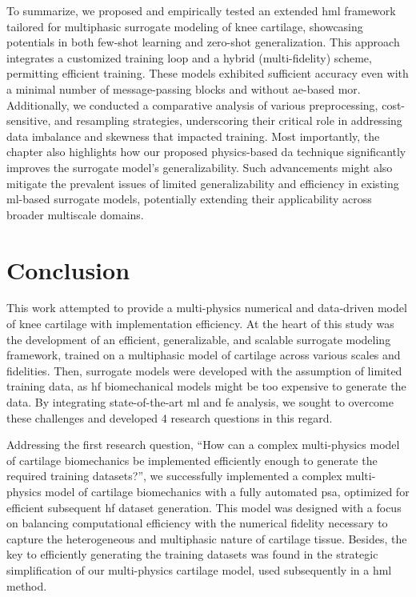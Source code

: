 To summarize, we proposed and empirically tested an extended \ac{hml} framework tailored for multiphasic surrogate modeling of knee cartilage, showcasing potentials in both few-shot learning and zero-shot generalization. This approach integrates a customized training loop and a hybrid (multi-fidelity) scheme, permitting efficient training. These models exhibited sufficient accuracy even with a minimal number of message-passing blocks and without \ac{ae}-based \ac{mor}. Additionally, we conducted a comparative analysis of various preprocessing, cost-sensitive, and resampling strategies, underscoring their critical role in addressing data imbalance and skewness that impacted training. Most importantly, the chapter also highlights how our proposed physics-based \ac{da} technique significantly improves the surrogate model's generalizability. Such advancements might also mitigate the prevalent issues of limited generalizability and efficiency in existing \ac{ml}-based surrogate models, potentially extending their applicability across broader multiscale domains.

\chapter{Conclusion}
%
This work attempted to provide a multi-physics numerical and data-driven model of knee cartilage with implementation efficiency. At the heart of this study was the development of an efficient, generalizable, and scalable surrogate modeling framework, trained on a multiphasic model of cartilage across various scales and fidelities. Then, surrogate models were developed with the assumption of limited training data, as \ac{hf} biomechanical models might be too expensive to generate the data. By integrating state-of-the-art \ac{ml} and \ac{fe} analysis, we sought to overcome these challenges and developed 4 research questions in this regard.

Addressing the first research question, ``How can a complex multi-physics model of cartilage biomechanics be implemented efficiently enough to generate the required training datasets?'', we successfully implemented a complex multi-physics model of cartilage biomechanics with a fully automated \ac{psa}, optimized for efficient subsequent \ac{hf} dataset generation. This model was designed with a focus on balancing computational efficiency with the numerical fidelity necessary to capture the heterogeneous and multiphasic nature of cartilage tissue. Besides, the key to efficiently generating the training datasets was found in the strategic simplification of our multi-physics cartilage model, used subsequently in a \ac{hml} method.

